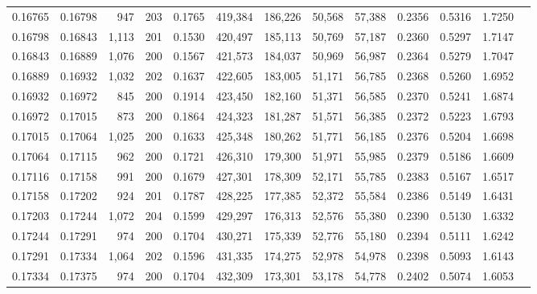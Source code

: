 \begin{tabular}{rrrrrrrrrrrrr}
0.16765 & 0.16798 &   947 & 203 &                                     0.1765 & 419,384 & 186,226 &  50,568 &  57,388 & 0.2356 & 0.5316 & 1.7250 \\
0.16798 & 0.16843 & 1,113 & 201 &                                     0.1530 & 420,497 & 185,113 &  50,769 &  57,187 & 0.2360 & 0.5297 & 1.7147 \\
0.16843 & 0.16889 & 1,076 & 200 &                                     0.1567 & 421,573 & 184,037 &  50,969 &  56,987 & 0.2364 & 0.5279 & 1.7047 \\
0.16889 & 0.16932 & 1,032 & 202 &                                     0.1637 & 422,605 & 183,005 &  51,171 &  56,785 & 0.2368 & 0.5260 & 1.6952 \\
0.16932 & 0.16972 &   845 & 200 &                                     0.1914 & 423,450 & 182,160 &  51,371 &  56,585 & 0.2370 & 0.5241 & 1.6874 \\
0.16972 & 0.17015 &   873 & 200 &                                     0.1864 & 424,323 & 181,287 &  51,571 &  56,385 & 0.2372 & 0.5223 & 1.6793 \\
0.17015 & 0.17064 & 1,025 & 200 &                                     0.1633 & 425,348 & 180,262 &  51,771 &  56,185 & 0.2376 & 0.5204 & 1.6698 \\
0.17064 & 0.17115 &   962 & 200 &                                     0.1721 & 426,310 & 179,300 &  51,971 &  55,985 & 0.2379 & 0.5186 & 1.6609 \\
0.17116 & 0.17158 &   991 & 200 &                                     0.1679 & 427,301 & 178,309 &  52,171 &  55,785 & 0.2383 & 0.5167 & 1.6517 \\
0.17158 & 0.17202 &   924 & 201 &                                     0.1787 & 428,225 & 177,385 &  52,372 &  55,584 & 0.2386 & 0.5149 & 1.6431 \\
0.17203 & 0.17244 & 1,072 & 204 &                                     0.1599 & 429,297 & 176,313 &  52,576 &  55,380 & 0.2390 & 0.5130 & 1.6332 \\
0.17244 & 0.17291 &   974 & 200 &                                     0.1704 & 430,271 & 175,339 &  52,776 &  55,180 & 0.2394 & 0.5111 & 1.6242 \\
0.17291 & 0.17334 & 1,064 & 202 &                                     0.1596 & 431,335 & 174,275 &  52,978 &  54,978 & 0.2398 & 0.5093 & 1.6143 \\
0.17334 & 0.17375 &   974 & 200 &                                     0.1704 & 432,309 & 173,301 &  53,178 &  54,778 & 0.2402 & 0.5074 & 1.6053 \\

\end{tabular}
